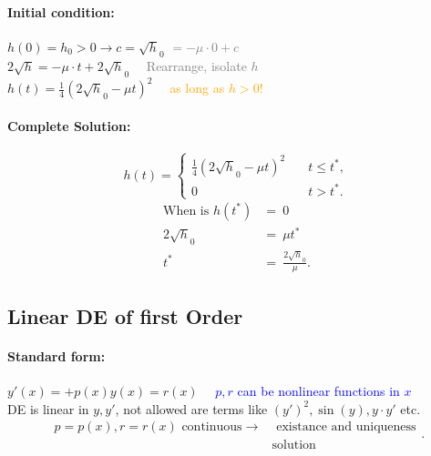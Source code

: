 \documentclass[]{article}
\begin{document}
	\paragraph{Initial condition:} $h(0)= h_0 > 0 \rightarrow c=\sqrt h_0$ \textcolor{gray}{$=-\mu \cdot 0+c$}\\
	$2\sqrt h = -\mu \cdot t + 2\sqrt h_0\quad$ \textcolor{gray}{Rearrange, isolate $h$}\\
	$h(t)= \frac{1}{4}(2\sqrt h_0 - \mu t ) ^{2}\quad$ \textcolor{orange}{as long as $h >0$!}
	\begin{multicols}{2}
	\begin{center}
	\end{center}
	\paragraph{Complete Solution:} 
	\[
	h(t) =
	\begin{cases} 
	\frac{1}{4}(2\sqrt h_0-\mu t) ^{2}\quad & t\le t ^{*}, \\
		0 & t >t ^{*}.
	\end{cases}
	\]
	\[
	\begin{split}
		\text{When is }h(t ^{*}) & =~0\\
		2\sqrt h_0 & =~\mu t ^{*}\\
		t ^{*} & = ~ \frac{2\sqrt h_0}{\mu}.
	\end{split}
	\]
	\end{multicols}

	\subsection{Linear DE of first Order}
	\paragraph{Standard form:} $ y'(x)=+p(x)y(x)=r(x) \quad$ \textcolor{blue}{$p,r$ can be nonlinear functions in $x$}\\
	DE is linear in $y,y'$, not allowed are terms like $(y') ^{2},\sin(y),y \cdot y'$ etc.
	\[
		\begin{split}
			p=p(x),r=r(x) \text{ continuous} \rightarrow & \text{ existance and uniqueness}  \\
			 & \text{solution}
		\end{split}
	.\]
\end{document}

